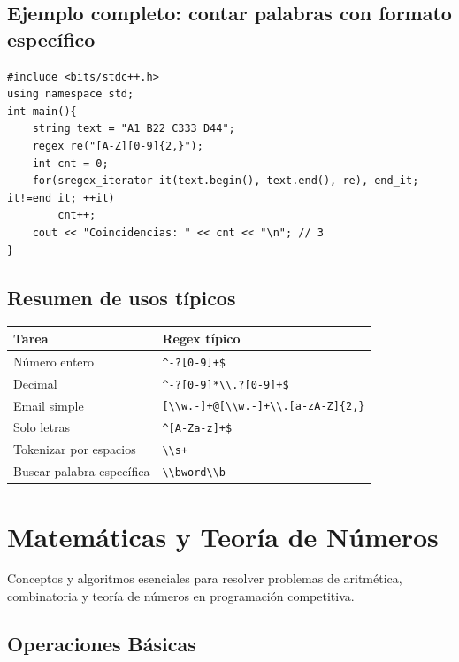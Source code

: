 \documentclass{article}
\begin{document}
\subsection{Ejemplo completo: contar palabras con formato específico}
\begin{lstlisting}[style=cppstyle]
#include <bits/stdc++.h>
using namespace std;
int main(){
    string text = "A1 B22 C333 D44";
    regex re("[A-Z][0-9]{2,}");
    int cnt = 0;
    for(sregex_iterator it(text.begin(), text.end(), re), end_it; it!=end_it; ++it)
        cnt++;
    cout << "Coincidencias: " << cnt << "\n"; // 3
}
\end{lstlisting}

\subsection{Resumen de usos típicos}

\begin{center}
\begin{tabular}{ll}
\hline
Tarea & Regex típico \\
\hline
Número entero & \lstinline|^-?[0-9]+$| \\
Decimal & \lstinline|^-?[0-9]*\\.?[0-9]+$| \\
Email simple & \lstinline|[\\w.-]+@[\\w.-]+\\.[a-zA-Z]{2,}| \\
Solo letras & \lstinline|^[A-Za-z]+$| \\
Tokenizar por espacios & \lstinline|\\s+| \\
Buscar palabra específica & \lstinline|\\bword\\b| \\
\hline
\end{tabular}
\end{center}


\section{Matemáticas y Teoría de Números}

Conceptos y algoritmos esenciales para resolver problemas de aritmética, combinatoria y teoría de números en programación competitiva.

\subsection{Operaciones Básicas}
\end{document}
